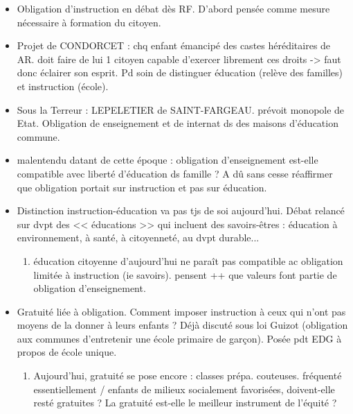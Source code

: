 \documentclass[12pt]{article}
\begin{document}
\begin{itemize}
\item Obligation d'instruction en débat dès RF. D'abord pensée comme mesure nécessaire à formation du citoyen.\\

\item Projet de CONDORCET : chq enfant émancipé  des castes héréditaires de AR. doit faire de lui 1 citoyen capable d'exercer librement ces droits -> faut donc éclairer son esprit. Pd soin de distinguer éducation (relève des familles) et instruction (école). \\

\item Sous la Terreur : LEPELETIER de SAINT-FARGEAU. prévoit monopole de Etat. Obligation de enseignement et de internat ds des maisons d'éducation commune. \\

\item malentendu datant de cette époque : obligation d'enseignement est-elle compatible avec liberté d'éducation ds famille ? A dû sans cesse réaffirmer que obligation portait sur instruction et pas sur éducation. \\

\item Distinction instruction-éducation va pas tjs de soi aujourd'hui. Débat relancé sur dvpt des << éducations >> qui incluent des savoirs-êtres : éducation à environnement, à santé, à citoyenneté, au dvpt durable... \\
\begin{enumerate}
\item éducation citoyenne d'aujourd'hui ne paraît pas compatible ac obligation limitée à instruction (ie savoirs). pensent ++ que valeurs font partie de obligation d'enseignement.\\
\end{enumerate}
 
 \item Gratuité liée à obligation. Comment imposer instruction à ceux qui n'ont pas moyens de la donner à leurs enfants ? Déjà discuté sous loi Guizot (obligation aux communes d'entretenir une école primaire de garçon). Posée pdt EDG à propos de école unique.
 \begin{enumerate}
 \item Aujourd'hui, gratuité se pose encore : classes prépa. couteuses. fréquenté essentiellement / enfants de milieux socialement favorisées, doivent-elle resté gratuites ? La gratuité est-elle le meilleur instrument de l'équité ?\\
 \end{enumerate}


\end{itemize}
\end{document}
